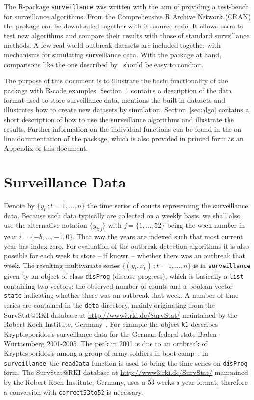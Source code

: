 \documentclass[a4paper,11pt]{article}
\newcommand{\surveillance}{\texttt{surveillance}}
\begin{document}
The R-package \texttt{surveillance} was written with the aim of
providing a test-bench for surveillance algorithms. From the
Comprehensive R Archive Network (CRAN) the package can be downloaded
together with its source code. It allows users to test new algorithms
and compare their results with those of standard surveillance
methods. A few real world outbreak datasets are included together with
mechanisms for simulating surveillance data.  With the package at
hand, comparisons like the one described by~\citet{hutwagner2005}
should be easy to conduct.

The purpose of this document is to illustrate the basic functionality
of the package with R-code examples.  Section~\ref{sec:data} contains
a description of the data format used to store surveillance data,
mentions the built-in datasets and illustrates how to create new
datasets by simulation.  Section~\ref{sec:algo} contains a short
description of how to use the surveillance algorithms and illustrate
the results.  Further information on the individual functions can be
found in the on-line documentation of the package, which is also
provided in printed form as an Appendix of this document.

\section{Surveillance Data}\label{sec:data}
Denote by $\{y_t\>;t=1,\ldots,n\}$ the time series of counts
representing the surveillance data. Because such data typically are
collected on a weekly basis, we shall also use the alternative
notation $\{y_{i:j}\}$ with $j=\{1,\ldots,52\}$ being the week number
in year $i=\{-b,\ldots,-1,0\}$. That way the years are indexed such
that most current year has index zero. For evaluation of the outbreak
detection algorithms it is also possible for each week to store -- if
known -- whether there was an outbreak that week. The resulting
multivariate series $\{(y_t,x_t)\>; t=1,\ldots,n\}$ is in
\texttt{surveillance} given by an object of class \texttt{disProg}
(disease progress), which is basically a \texttt{list} containing two
vectors: the observed number of counts and a boolean vector
\texttt{state} indicating whether there was an outbreak that week. A
number of time series are contained in the \texttt{data} directory,
mainly originating from the SurvStat@RKI database at
\href{http://www3.rki.de/SurvStat/}{http://www3.rki.de/SurvStat/}
maintained by the Robert Koch Institute, Germany~\citep{survstat}.
For example the object \texttt{k1} describes Kryptosporidosis
surveillance data for the German federal state Baden-Württemberg
2001-2005. The peak in 2001 is due to an outbreak of Kryptosporidosis
among a group of army-soldiers in boot-camp~\citep{bulletin3901}. In
\surveillance\ the \texttt{readData} function is used to bring the
time series on \texttt{disProg} form. The SurvStat@RKI database at
\href{http://www3.rki.de/SurvStat/}{http://www3.rki.de/SurvStat/}
maintained by the Robert Koch Institute, Germany, uses a 53 weeks a
year format; therefore a conversion with \texttt{correct53to52} is
necessary.
\end{document}
